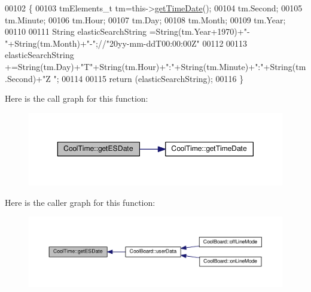 \begin{DoxyCode}
00102 \{
00103     tmElements\_t tm=this->\hyperlink{class_cool_time_a7a7501c5ca77dd1248bea704c44f986c}{getTimeDate}();
00104     tm.Second; 
00105     tm.Minute; 
00106     tm.Hour; 
00107     tm.Day;
00108     tm.Month; 
00109     tm.Year; 
00110     
00111     String elasticSearchString =String(tm.Year+1970)+\textcolor{stringliteral}{"-"}+String(tm.Month)+\textcolor{stringliteral}{"-"};\textcolor{comment}{//"20yy-mm-ddT00:00:00Z"}
00112 
00113     elasticSearchString +=String(tm.Day)+\textcolor{stringliteral}{"T"}+String(tm.Hour)+\textcolor{stringliteral}{":"}+String(tm.Minute)+\textcolor{stringliteral}{":"}+String(tm.Second)+\textcolor{stringliteral}{"Z
      "};
00114     
00115     \textcolor{keywordflow}{return} (elasticSearchString);
00116 \}
\end{DoxyCode}
Here is the call graph for this function\+:
\nopagebreak
\begin{figure}[H]
\begin{center}
\leavevmode
\includegraphics[width=350pt]{class_cool_time_ac4f32ee513c1328d984306645e8785a4_cgraph}
\end{center}
\end{figure}
Here is the caller graph for this function\+:
\nopagebreak
\begin{figure}[H]
\begin{center}
\leavevmode
\includegraphics[width=350pt]{class_cool_time_ac4f32ee513c1328d984306645e8785a4_icgraph}
\end{center}
\end{figure}
\mbox{\label{class_cool_time_a5d17f707a9d337720493b2bce9d41c21}} 

